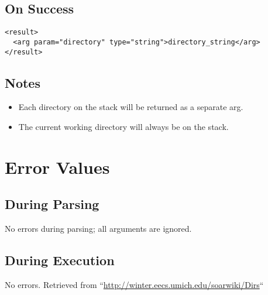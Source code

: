 \documentclass[10pt]{article}
\begin{document}
\subsection*{ On Success }
\begin{verbatim}
<result>
  <arg param="directory" type="string">directory_string</arg>
</result>

\end{verbatim}
\subsection*{ Notes }
\begin{itemize}
\item  Each directory on the stack will be returned as a separate arg. 
\item  The current working directory will always be on the stack. 

\end{itemize}
\section*{ Error Values }
\subsection*{ During Parsing }


 No errors during parsing; all arguments are ignored. 
\subsection*{ During Execution }


 No errors.  Retrieved from ``\url{http://winter.eecs.umich.edu/soarwiki/Dirs}``
\end{document}

